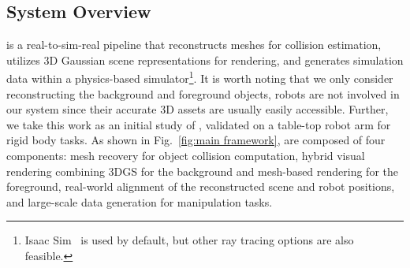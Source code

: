 \subsection{System Overview}
\our is a real-to-sim-real pipeline that reconstructs meshes for collision estimation, utilizes 3D Gaussian scene representations for rendering, and generates simulation data within a physics-based simulator\footnote{Isaac Sim~\citep{isaacsim} is used by default, but other ray tracing options are also feasible.}. 
It is worth noting that we only consider reconstructing the background and foreground objects, robots are not involved in our system since their accurate 3D assets are usually easily accessible. 
Further, we take this work as an initial study of \our, validated on a table-top robot arm for rigid body tasks.
As shown in Fig.~\ref{fig:main framework}, \our are composed of four components: 
mesh recovery for object collision computation, hybrid visual rendering combining 3DGS for the background and mesh-based rendering for the foreground, real-world alignment of the reconstructed scene and robot positions, and large-scale data generation for manipulation tasks.



